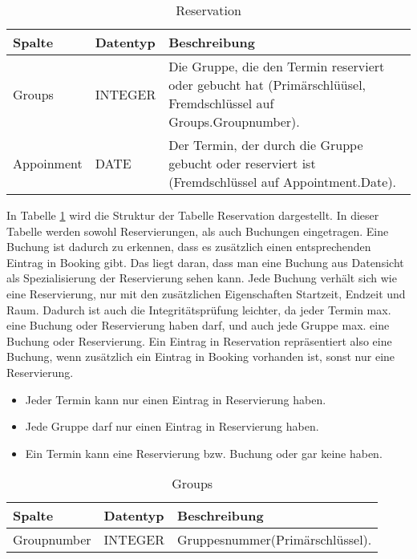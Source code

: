 \begin{table}[h]
\centering
	\caption{Reservation}
	\label{tab:Reservation}
    \begin{tabular}{| p{2cm} | p{3cm} | p{10cm} |}
    \hline
    \rowcolor{lightgray} Spalte & Datentyp & Beschreibung  \\ \hline
    Groups & INTEGER & Die Gruppe, die den Termin reserviert oder gebucht hat (Primärschlüüsel, Fremdschlüssel auf Groups.Groupnumber).  \\ \hline
    Appoinment & DATE & Der Termin, der durch die Gruppe gebucht oder reserviert ist (Fremdschlüssel auf Appointment.Date). \\ \hline
    \end{tabular}
\end{table}
In Tabelle \ref{tab:Reservation} wird die Struktur der Tabelle Reservation  dargestellt.  In dieser Tabelle werden sowohl Reservierungen, als auch Buchungen eingetragen. Eine Buchung ist dadurch zu erkennen, dass es zusätzlich einen entsprechenden Eintrag in Booking gibt. Das liegt daran, dass man eine Buchung aus Datensicht als Spezialisierung der Reservierung sehen kann. Jede Buchung verhält sich wie eine Reservierung, nur mit den zusätzlichen Eigenschaften Startzeit, Endzeit und Raum. Dadurch ist auch die Integritätsprüfung leichter, da jeder Termin max. eine Buchung oder Reservierung haben darf, und auch jede Gruppe max. eine Buchung oder Reservierung. Ein Eintrag in Reservation repräsentiert also eine Buchung, wenn zusätzlich ein Eintrag in Booking vorhanden ist, sonst nur eine Reservierung.

\begin{itemize}
	\item Jeder Termin kann nur einen Eintrag in Reservierung haben.
	\item Jede Gruppe darf nur einen Eintrag in Reservierung haben.
	\item Ein Termin kann eine Reservierung bzw. Buchung oder gar keine haben.
\end{itemize}

\begin{table}[h]
\centering
\caption{Groups}
    \label{tab:Groups}
    \begin{tabular}{| p{2cm} | p{3cm} | p{10cm} |}
    \hline
    \rowcolor{lightgray} Spalte & Datentyp & Beschreibung  \\ \hline
    Groupnumber & INTEGER & Gruppesnummer(Primärschlüssel).  \\ \hline
   \end{tabular}
\end{table}

